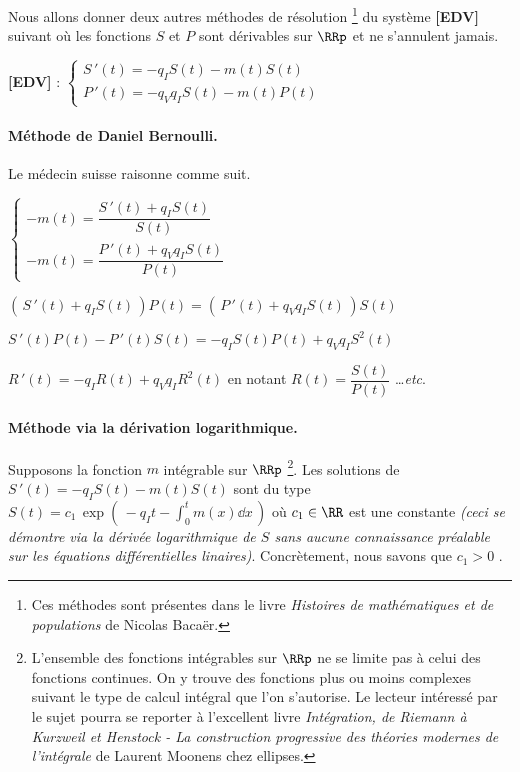 Nous allons donner deux autres méthodes de résolution
\footnote{
	Ces méthodes sont présentes dans le livre \emph{\og Histoires de mathématiques et de populations \fg} de Nicolas Bacaër. 
}
du système \textbf{[EDV]} suivant où les fonctions $S$ et $P$ sont dérivables sur $\RRp$ et ne s'annulent jamais.

\medskip

\textbf{[EDV]} :
$\begin{cases}
	S\,'(t) = - q_I S(t) - m(t) S(t)     \\
	P\,'(t) = - q_V q_I S(t) - m(t) P(t)
\end{cases}$



\paragraph{Méthode de Daniel Bernoulli.} Le médecin suisse raisonne comme suit.

\medskip

$\begin{cases}
	- m(t) = \dfrac{S\,'(t) + q_I S(t)}{S(t)}     \\
	- m(t) = \dfrac{P\,'(t) + q_V q_I S(t)}{P(t)}
\end{cases}$

\medskip

$\left( \, S\,'(t) + q_I S(t) \, \right) P(t) = \left( \, P\,'(t) + q_V q_I S(t) \, \right) S(t)$

\bigskip

$S\,'(t) P(t) - P\,'(t) S(t) = - q_I S(t) P(t) + q_V q_I S^2(t)$

\medskip

$R\,'(t) = - q_I R(t) + q_V q_I R^2(t)$ en notant $R(t) = \dfrac{S(t)}{P(t)}$ \dots \emph{etc}.





\paragraph{Méthode via la dérivation logarithmique.} Supposons la fonction $m$ intégrable sur $\RRp$
\footnote{
	L'ensemble des fonctions intégrables sur $\RRp$ ne se limite pas à celui des fonctions continues. On y trouve des fonctions plus ou moins complexes suivant le type de calcul intégral que l'on s'autorise. Le lecteur intéressé par le sujet pourra se reporter à l'excellent livre \emph{\og Intégration, de Riemann à Kurzweil et Henstock - La construction progressive des théories modernes de l'intégrale \fg} de Laurent Moonens chez ellipses. 
}.
Les solutions de $S\,'(t) = - q_I S(t) - m(t) S(t)$ sont du type $\displaystyle S(t) = c_1 \, \exp \left( \, - q_I t - \int_0^t m(x) \dd{x} \, \right)$ où $c_1 \in \RR$ est une constante \emph{(ceci se démontre via la dérivée logarithmique de $S$ sans aucune connaissance préalable sur les équations différentielles linaires)}. Concrètement, nous savons que $c_1 > 0$ .

